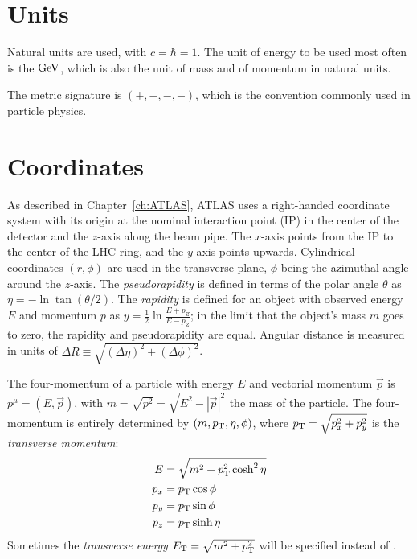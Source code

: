 \section{Units}
Natural units are used, with $c=\hbar=1$.
The unit of energy to be used most often is the $\mathrm{GeV}$, which is also the unit of mass and of momentum in natural units.

The metric signature is $(+,-,-,-)$, which is the convention commonly used in particle physics.

\section{Coordinates}
As described in Chapter~\ref{ch:ATLAS}, ATLAS uses a right-handed coordinate system with its origin at the nominal interaction point (IP)
in the center of the detector and the \(z\)-axis along the beam pipe.
The \(x\)-axis points from the IP to the center of the LHC ring,
and the \(y\)-axis points upwards.
Cylindrical coordinates \((r,\phi)\) are used in the transverse plane,
\(\phi\) being the azimuthal angle around the \(z\)-axis.
The \textit{pseudorapidity} is defined in terms of the polar angle \(\theta\) as \(\eta = -\ln \tan(\theta/2)\).
The \textit{rapidity} is defined for an object with observed energy $E$ and momentum $p$ as \(y = \frac{1}{2}\ln\frac{E+p_Z}{E-p_Z}\); in the limit that the object's mass $m$ goes to zero, the rapidity and pseudorapidity are equal.
Angular distance is measured in units of \(\Delta R \equiv \sqrt{(\Delta\eta)^{2} + (\Delta\phi)^{2}}\).

The four-momentum of a particle with energy $E$ and vectorial momentum $\vec{p}$ is $p^\mu=(E,\vec{p})$, with $m=\sqrt{p^2}=\sqrt{E^2-|\vec{p}|^2}$ the mass of the particle.
The four-momentum is entirely determined by $(m,p_{\text{T}},\eta,\phi)$, where $p_{\text{T}}=\sqrt{p_x^2+p_y^2}$ is the \textit{transverse momentum}:
\begin{align}
E &= \sqrt{m^2+p_{\text{T}}^2 \cosh^2\eta}\\
p_x &= p_{\text{T}} \cos \phi\\
p_y &= p_{\text{T}} \sin \phi\\
p_z &= p_{\text{T}} \sinh \eta
\end{align}
Sometimes the \textit{transverse energy} $E_{\text{T}} = \sqrt{m^2+p_{\text{T}}^2}$ will be specified instead of \pT.


